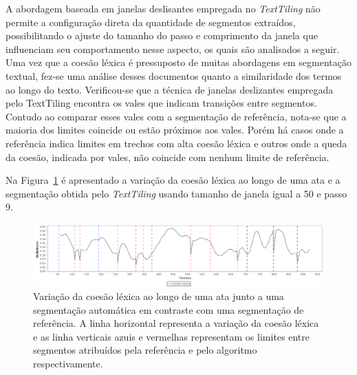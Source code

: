 

A abordagem baseada em janelas deslisantes empregada no \textit{TextTiling} não permite a configuração direta da quantidade de segmentos extraídos, possibilitando o ajuste do tamanho do passo e comprimento da janela que influenciam seu comportamento nesse aspecto, os quais são analisados a seguir.
Uma vez que a coesão léxica é pressuposto de muitas abordagens em segmentação textual, fez-se uma análise desses documentos quanto a similaridade dos termos ao longo do texto. Verificou-se que a técnica de janelas deslizantes empregada pelo TextTiling encontra os vales que indicam transições entre segmentos. Contudo ao comparar esses vales com a segmentação de referência, nota-se que a maioria dos limites coincide ou estão próximos aos vales. Porém há casos onde a referência indica limites em trechos com alta coesão léxica e outros onde a queda da coesão, indicada por vales, não coincide com nenhum limite de referência.  

Na Figura~\ref{fig:coesaolexicaTT} é apresentado a variação da coesão léxica ao longo de uma ata e a segmentação obtida pelo \textit{TextTiling} usando tamanho de janela igual a 50 e passo 9. 


  \begin{figure}[!h]
	  \centering
	  \includegraphics[width=\textwidth]{conteudo/capitulos/figs/coesaolexicaTT-50-9.png}
	  \caption{Variação da coesão léxica ao longo de uma ata junto a uma segmentação automática em contraste com uma segmentação de referência.
	  A linha horizontal representa a variação da coesão léxica e as linha verticais azuis e vermelhas representam os limites entre segmentos atribuídos pela referência e pelo algoritmo respectivamente. 
  }
	  \label{fig:coesaolexicaTT}
  \end{figure}









